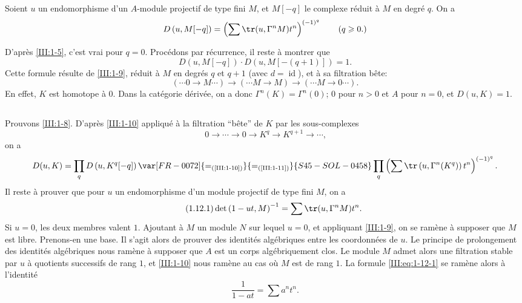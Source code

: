 \begin{lemma_}\label{III:1-11}
Soient $u$ un endomorphisme d'un $A$-module projectif de type fini $M$, et 
$M[-q]$ le complexe réduit à $M$ en degré $q$. On a 
\[
  D\left(u,M[-q]\right) = \left(\sum \tr(u,\Gamma^n M) t^n\right)^{(-1)^q} \qquad \text{($q\geqslant 0$.)}
\]
\end{lemma_}





D'après \ref{III:1-5}, c'est vrai pour $q=0$. Procédons par récurrence, il 
reste à montrer que 
\[
  D\left(u,M[-q]\right) \cdot D\left(u,M[-(q+1)]\right) = 1 \text{.}
\]
Cette formule résulte de \ref{III:1-9},  réduit à 
$M$ en degrés $q$ et $q+1$ (avec $d=\operatorname{id}$), et à sa 
filtration bête:
\[
  (\cdots 0 \to M \cdots) \to (\cdots M \to M) \to (\cdots M \to 0 \cdots) \text{.}
\]
En effet, $K$ est homotope à $0$. Dans la catégorie dérivée, on a donc 
$\Gamma^n(K)=\Gamma^n(0)$; $0$ pour $n>0$ et $A$ pour $n=0$, et $D(u,K)=1$. 





\subsection{}\label{III:1-12}

Prouvons \ref{III:1-8}. D'après \ref{III:1-10} appliqué à la filtration 
``bête'' de $K$ par les sous-complexes 
\[
  0 \to \cdots \to 0 \to K^q \to K^{q+1} \to \cdots \text{,}
\]
on a 
\[
  D(u,K) = \prod_q D\left(u,K^q[-q]\right) \var[FR-0072]{=_{\text{(\ref{III:1-10})}}}{=_{\text{(\ref{III:1-11})}}}{S45-SOL-0458} \prod_q \left(\sum \tr\left(u,\Gamma^n(K^q)\right) t^n \right)^{(-1)^q} \text{.}
\]
Il reste à prouver que pour $u$ un endomorphisme d'un module projectif de type 
fini $M$, on a 
\begin{equation*}\tag{1.12.1}\label{III:eq:1-12-1}
  \det\left(1-u t,M\right)^{-1} = \sum \tr(u,\Gamma^n M) t^n \text{.}
\end{equation*}
Si $u=0$, les deux membres valent $1$. Ajoutant à $M$ un module $N$ sur lequel 
$u=0$, et appliquant \ref{III:1-9}, on se ramène à supposer que $M$ est libre. 
Prenons-en une base. Il s'agit alors de prouver des identités algébriques 
entre les coordonnées de $u$. Le principe de prolongement des identités 
algébriques nous ramène à supposer que $A$ est un corps algébriquement 
clos. Le module $M$ admet alors une filtration stable par $u$ à quotients 
successifs de rang $1$, et \ref{III:1-10} nous ramène au cas où $M$ est de 
rang $1$. La formule \eqref{III:eq:1-12-1} se ramène alors à l'identité 
\[
  \frac{1}{1-a t} = \sum a^n t^n \text{.}
\]





